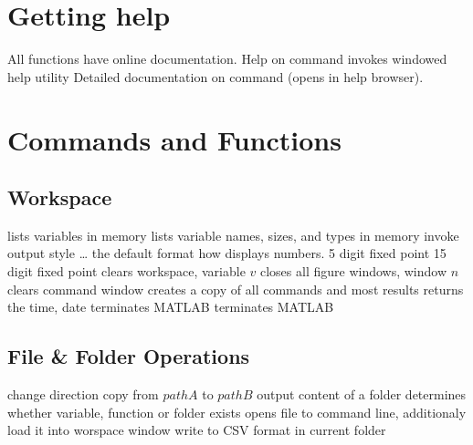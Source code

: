 
\def\content{\uppercase{MatLab}}
\def\shortcontent{\content}
\def\versionnumber{0.4}  %
\def\version{v\versionnumber\ \month\ \year}


\mytitle

\shortintro

\section{Getting help}{All \ml functions have online documentation.}
	{Help on command}
	{invokes windowed help utility}
	{Detailed documentation on command (opens in help browser).}

\section{Commands and Functions}{}
\subsection{Workspace}{}
	{lists variables in memory}
	{lists variable names, sizes, and types in memory}
	{invoke output style \ldots}
	{the default format how \ml displays numbers.}
	{5 digit fixed point}
	{15 digit fixed point}
	{clears workspace, variable $v$}
	{closes all figure windows, window $n$}
	{clears command window}
	{creates a copy of all commands and most results}
	{returns the time, date}
	{terminates MATLAB}
	{terminates MATLAB}

\subsection{File \& Folder Operations}{}
	{change direction}
	{copy from $pathA$ to $pathB$}
	{output content of a folder}
	{determines whether variable, function or folder exists}
	{opens file to command
    line, additionaly load it into worspace window}
	{write to CSV format in current folder}


